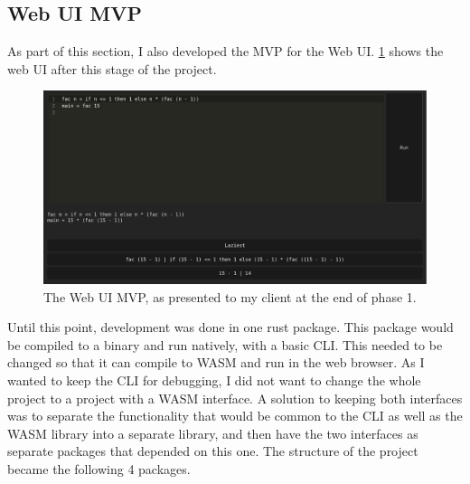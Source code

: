 \subsection{Web UI \ac{MVP}}
As part of this section, I also developed the MVP for the Web UI. \ref{fig:screenshot_phase_1_end} shows the web UI after this stage of the project. 

\begin{figure}[h]
    \centering
    \includegraphics[width=1\linewidth]{images/phase-1-end.png} 
    \captionsetup{justification=centering}
    \caption{The Web UI \ac{MVP}, as presented to my client at the end of phase 1.}
    \label{fig:screenshot_phase_1_end}
\end{figure}

Until this point, development was done in one rust package. This package would be compiled to a binary and run natively, with a basic \ac{CLI}. This needed to be changed so that it can compile to \ac{WASM} and run in the web browser. As I wanted to keep the \ac{CLI} for debugging, I did not want to change the whole project to a project with a \ac{WASM} interface. A solution to keeping both interfaces was to separate the functionality that would be common to the \ac{CLI} as well as the \ac{WASM} library into a separate library, and then have the two interfaces as separate packages that depended on this one. The structure of the project became the following 4 packages. 

